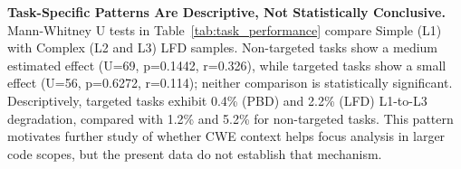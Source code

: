 \documentclass[lettersize,journal]{IEEEtran}
\begin{document}
{%
\begin{table}[!t]
    \centering%
    \caption{Model robustness by abstraction sensitivity. Degradation = L1 $-$ L3 accuracy; negative indicates improvement. Ranked by average degradation (worst $\rightarrow$ best).}
    \label{tab:robustness}
    \small
    \renewcommand{\arraystretch}{1.2}
\end{table}
}

\textbf{Task-Specific Patterns Are Descriptive, Not Statistically Conclusive.} Mann-Whitney U tests in Table~\ref{tab:task_performance} compare Simple (L1) with Complex (L2 and L3) LFD samples. Non-targeted tasks show a medium estimated effect (U=69, p=0.1442, r=0.326), while targeted tasks show a small effect (U=56, p=0.6272, r=0.114); neither comparison is statistically significant. Descriptively, targeted tasks exhibit 0.4\% (PBD) and 2.2\% (LFD) L1-to-L3 degradation, compared with 1.2\% and 5.2\% for non-targeted tasks. This pattern motivates further study of whether CWE context helps focus analysis in larger code scopes, but the present data do not establish that mechanism.
\end{document}
